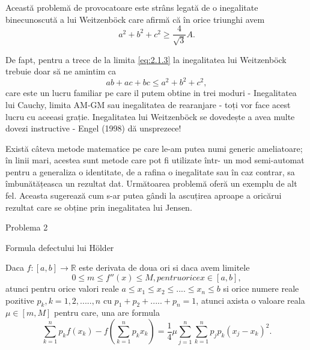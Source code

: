 \documentclass[a4paper,12pt,oneside]{report}
\begin{document}
Această problemă de provocatoare este strâns legată de o inegalitate binecunoscută a lui Weitzenböck care afirmă că în orice triunghi avem 
\begin{displaymath}
  a^{2} + b^{2} + c^{2} \geq \frac{4}{\sqrt{3}}A . \label{eq:2.1.4} \tag{2.4}
\end{displaymath}

De fapt, pentru a trece de la limita \ref{eq:2.1.3} la inegalitatea lui Weitzenböck trebuie doar să ne amintim ca 
\begin{displaymath}
  ab + ac + bc \leq a^{2} + b^{2} + c^{2}, 
\end{displaymath}
care este un lucru familiar pe care il putem obtine in trei moduri  - Inegalitatea lui Cauchy, limita AM-GM sau inegalitatea de rearanjare -  toți vor face acest lucru cu aceeasi grație.
	Inegalitatea lui Weitzenböck se dovedește a avea multe dovezi instructive - Engel (1998) dă unsprezece! 

Există câteva metode matematice pe care le-am putea numi generic ameliatoare; în linii mari, acestea sunt metode care pot fi utilizate într- un mod semi-automat pentru a generaliza o identitate, de a rafina o inegalitate sau în caz contrar, sa îmbunătățeasca un rezultat dat. 
Următoarea problemă oferă un exemplu de alt fel. Aceasta sugerează cum s-ar putea gândi la ascuțirea aproape a oricărui rezultat care se obține prin inegalitatea lui Jensen.


Problema 2

Formula defectului lui Hölder

Daca \(f : \left [ a,b  \right ] \to \mathbb{R}\) este derivata de doua ori si daca avem limitele 
\begin{displaymath}
  0 \leq m \leq  f''\left ( x \right ) \leq  M , pentru orice x\in \left [ a,b \right ], \label{eq:2.2.1} \tag{2.2.1}
\end{displaymath}
atunci pentru orice valori reale \(a\leq x_{1}\leq x_{2}\leq ....\leq x_{n} \leq b \) si orice numere reale pozitive \(p_{k}, k= 1,2,.....,n \) cu \(p_{1} + p_{2} + .....+ p_{n} = 1\), atunci axista o valoare reala \(\mu \in \left [ m, M \right ]\) pentru care, una are formula
\begin{displaymath}
  \sum_{k = 1}^{n}p_{k}f\left ( x_{k} \right ) - f\left ( \sum_{k = 1}^{n} p_{k}x_{k}\right ) = \frac{1}{4}\mu \sum_{j = 1}^{n}\sum_{k = 1}^{n}p_{j}p_{k}\left ( x_{j} - x_{k} \right )^{2}. \label{eq:2.2.2} \tag{2.2.2}
\end{displaymath}
\end{document}
